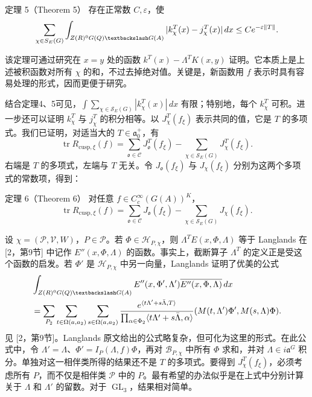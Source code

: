 \begin{originaltheorem}{定理 5（Theorem 5）}
存在正常数 $C,\varepsilon$，使
\[
 \sum_{\chi\in\mathcal S_E(G)}\int_{Z(\R)^0G(\Q)\backslash G(A)}
 |k_\chi^T(x)-j_\chi^T(x)|\,dx\le Ce^{-\varepsilon\|T\|}.
\]
\end{originaltheorem}
该定理可通过研究在 $x=y$ 处的函数 $k^T(x)-\Lambda^TK(x,y)$ 证明。它本质上是上述被积函数对所有 $\chi$ 的和，不过去掉绝对值。关键是，新函数用 $f$ 表示时具有容易处理的形式，因而更便于研究。

结合定理4、5可见，$\int\sum_{\chi\in\mathcal S_E(G)}|k_\chi^T(x)|\,dx$ 有限；特别地，每个 $k_\chi^T$ 可积。进一步还可以证明 $k_\chi^T$ 与 $j_\chi^T$ 的积分相等。以 $J_\chi^T(f_\xi)$ 表示共同的值，它是 $T$ 的多项式。我们已证明，对适当大的 $T\in\mathfrak a_0^+$，有
\[
 \operatorname{tr}R_{\mathrm{cusp},\xi}(f)
 =\sum_{\mathfrak o\in\mathcal C}J_\mathfrak o^T(f_\xi)
 -\sum_{\chi\in\mathcal S_E(G)}J_\chi^T(f_\xi).
\]
右端是 $T$ 的多项式，左端与 $T$ 无关。令 $J_\mathfrak o(f_\xi)$ 与 $J_\chi(f_\xi)$ 分别为这两个多项式的常数项，得到：
\begin{originaltheorem}{定理 6（Theorem 6）}
对任意 $f\in C_c^\infty(G(A))^K$，
\[
 \operatorname{tr}R_{\mathrm{cusp},\xi}(f)
 =\sum_{\mathfrak o\in\mathcal C}J_\mathfrak o(f_\xi)
 -\sum_{\chi\in\mathcal S_E(G)}J_\chi(f_\xi).
\]
\end{originaltheorem}

设 $\chi=(\mathcal P,\mathcal V,W)$，$P\in\mathcal P$。若 $\Phi\in\mathcal H_{P,\chi}$，则
$\Lambda^TE(x,\Phi,\Lambda)$ 等于 Langlands 在 [2，第9节] 中记作 $E''(x,\Phi,\Lambda)$ 的函数。事实上，截断算子 $\Lambda^T$ 的定义正是受这个函数的启发。若 $\Phi'$ 是 $\mathcal H_{P,\chi}$ 中另一向量，Langlands 证明了优美的公式
\[
\begin{split}
 &\int_{Z(\R)^0G(\Q)\backslash G(A)}
 E''(x,\Phi',\Lambda')\overline{E''(x,\Phi,\Lambda)}\,dx\\
 &=\sum_{P_2}\sum_{t\in\Omega(\mathfrak a,\mathfrak a_2)}
 \sum_{s\in\Omega(\mathfrak a,\mathfrak a_2)}
 \frac{e^{\langle t\Lambda'+s\bar\Lambda,T\rangle}}
 {\prod_{\alpha\in\Phi_2}\langle t\Lambda'+s\bar\Lambda,\alpha\rangle}
 (M(t,\Lambda')\Phi',M(s,\Lambda)\Phi).
\end{split}
\]
见 [2，第9节]。Langlands 原文给出的公式略复杂，但可化为这里的形式。在此公式中，令
$\Lambda'=\Lambda$、$\Phi'=I_P(\Lambda,f)\Phi$，再对 $\mathcal B_{P,\chi}$ 中所有 $\Phi$ 求和，并对 $\Lambda\in i\mathfrak a^G$ 积分。单独对这一相伴类所得的结果还不是 $T$ 的多项式。要得到
$J_\chi^T(f_\xi)$，必须考虑所有 $P$，而不仅是相伴类 $\mathcal P$ 中的 $P$。最有希望的办法似乎是在上式中分别计算关于 $\Lambda$ 和 $\Lambda'$ 的留数。对于 $\operatorname{GL}_3$，结果相对简单。

